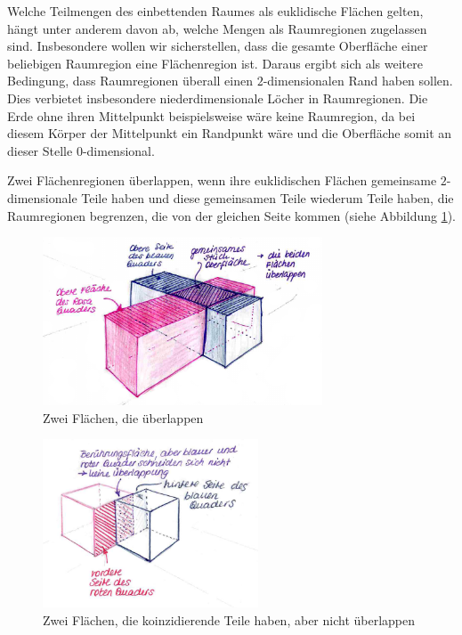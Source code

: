         Welche Teilmengen des einbettenden Raumes als euklidische Flächen gelten, hängt unter anderem davon ab, welche Mengen als Raumregionen zugelassen sind. Insbesondere wollen wir sicherstellen, dass die gesamte Oberfläche einer beliebigen Raumregion eine Flächenregion ist. Daraus ergibt sich als weitere Bedingung, dass Raumregionen überall einen $2$-dimensionalen Rand haben sollen. Dies verbietet insbesondere niederdimensionale Löcher in Raumregionen. Die Erde ohne ihren Mittelpunkt beispielsweise wäre keine Raumregion, da bei diesem Körper der Mittelpunkt ein Randpunkt wäre und die Oberfläche somit an dieser Stelle $0$-dimensional.
    
        Zwei Flächenregionen überlappen, wenn ihre euklidischen Flächen gemeinsame $2$-dimensionale Teile haben und diese gemeinsamen Teile wiederum Teile haben, die Raumregionen begrenzen, die von der gleichen Seite kommen (siehe Abbildung \ref{fig:overlap}).
    
%         
        \begin{figure}[ht]
            \centering
            \includegraphics[height=5cm]{luise/overlap.png}
            \caption{Zwei Flächen, die überlappen}
            \label{fig:overlap}
        \end{figure}
        
        \begin{figure}[ht]
            \centering
            \includegraphics[height=5cm]{luise/no-overlap.png}
            \caption{Zwei Flächen, die koinzidierende Teile haben, aber nicht überlappen}
            \label{fig:no-overlap}
        \end{figure}


